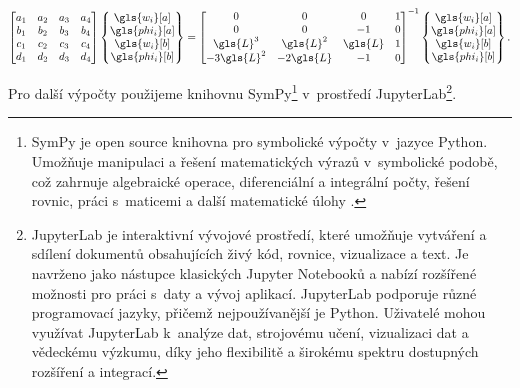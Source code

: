 \begin{equation}
    \label{eq:shape_func_bnd_cond}
    \begin{bmatrix}
        a_1 & a_2 & a_3 & a_4 \\
        b_1 & b_2 & b_3 & b_4 \\
        c_1 & c_2 & c_3 & c_4 \\
        d_1 & d_2 & d_3 & d_4 \\
    \end{bmatrix}
    \begin{Bmatrix}
        \gls{w_i}[a] \\
        \gls{phi_i}[a] \\
        \gls{w_i}[b] \\
        \gls{phi_i}[b] \\
    \end{Bmatrix}
    =
    \begin{bmatrix}
        0 & 0 & 0 & 1 \\
        0 & 0 & -1 & 0 \\
        \gls{L}^{3} & \gls{L}^{2} & \gls{L} & 1 \\
        -3 \gls{L}^{2} & -2 \gls{L} & -1 & 0 \\
    \end{bmatrix}^{-1}
    \begin{Bmatrix}
        \gls{w_i}[a] \\
        \gls{phi_i}[a] \\
        \gls{w_i}[b] \\
        \gls{phi_i}[b] \\
    \end{Bmatrix}.
\end{equation}

Pro další výpočty použijeme knihovnu SymPy\footnote{
    SymPy je open source knihovna pro symbolické výpočty v~jazyce Python. Umožňuje manipulaci a řešení matematických výrazů v~symbolické podobě, což zahrnuje algebraické operace, diferenciální a integrální počty, řešení rovnic, práci s~maticemi a další matematické úlohy \cite{sympy}.
} v~prostředí JupyterLab\footnote{
JupyterLab je interaktivní vývojové prostředí, které umožňuje vytváření a sdílení dokumentů obsahujících živý kód, rovnice, vizualizace a text. Je navrženo jako nástupce klasických Jupyter Notebooků a nabízí rozšířené možnosti pro práci s~daty a vývoj aplikací. JupyterLab podporuje různé programovací jazyky, přičemž nejpoužívanější je Python. Uživatelé mohou využívat JupyterLab k~analýze dat, strojovému učení, vizualizaci dat a vědeckému výzkumu, díky jeho flexibilitě a širokému spektru dostupných rozšíření a integrací.
}.

